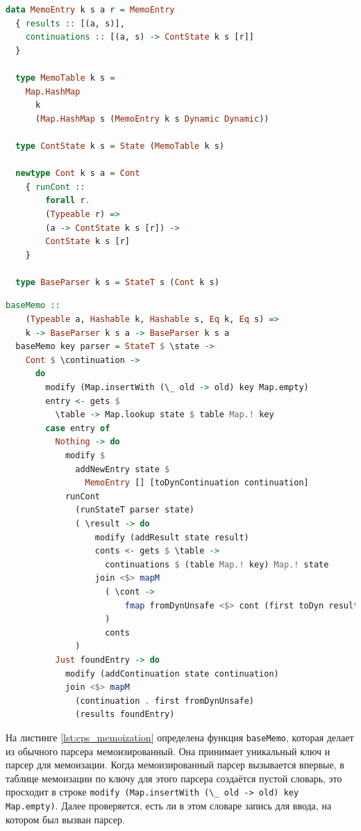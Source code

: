 \documentclass[times]{itmo-student-thesis}
\begin{document}
\begin{lstlisting}[language=Haskell,float=!h,caption={Типы для CPS парсера},label={lst:cps_types}]
  data MemoEntry k s a r = MemoEntry
  { results :: [(a, s)],
    continuations :: [(a, s) -> ContState k s [r]]
  }

  type MemoTable k s =
    Map.HashMap
      k
      (Map.HashMap s (MemoEntry k s Dynamic Dynamic))

  type ContState k s = State (MemoTable k s)

  newtype Cont k s a = Cont
    { runCont ::
        forall r.
        (Typeable r) =>
        (a -> ContState k s [r]) ->
        ContState k s [r]
    }

  type BaseParser k s = StateT s (Cont k s)
\end{lstlisting}

\begin{lstlisting}[language=Haskell,float=!h,caption={Мемоизация для CPS парсера},label={lst:cps_memoization}]
  baseMemo ::
    (Typeable a, Hashable k, Hashable s, Eq k, Eq s) =>
    k -> BaseParser k s a -> BaseParser k s a
  baseMemo key parser = StateT $ \state ->
    Cont $ \continuation ->
      do
        modify (Map.insertWith (\_ old -> old) key Map.empty)
        entry <- gets $
          \table -> Map.lookup state $ table Map.! key
        case entry of
          Nothing -> do
            modify $
              addNewEntry state $
                MemoEntry [] [toDynContinuation continuation]
            runCont
              (runStateT parser state)
              ( \result -> do
                  modify (addResult state result)
                  conts <- gets $ \table ->
                    continuations $ (table Map.! key) Map.! state
                  join <$> mapM
                    ( \cont ->
                        fmap fromDynUnsafe <$> cont (first toDyn result)
                    )
                    conts
              )
          Just foundEntry -> do
            modify (addContinuation state continuation)
            join <$> mapM
              (continuation . first fromDynUnsafe)
              (results foundEntry)
\end{lstlisting}

На листинге \ref{lst:cps_memoization} определена функция \lstinline{baseMemo}, которая делает из обычного парсера
мемоизированный. Она принимает уникальный ключ и парсер  для мемоизации. Когда мемоизированный парсер вызывается
впервые, в таблице мемоизации по ключу для этого парсера создаётся пустой словарь, это просходит в строке
\lstinline{modify (Map.insertWith (\_ old -> old) key Map.empty)}. Далее проверяется, есть ли в этом словаре запись для 
ввода, на котором был вызван парсер.
\end{document}
